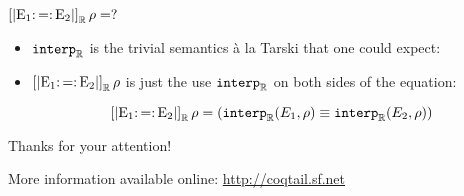 \documentclass{beamer}
\begin{document}
\begin{frame}{$\SemR = ?$}
\begin{itemize}
\item $\IR$ is the trivial semantics à la Tarski that one could expect:
\item<2-> $\SemR$ is just the use $\IR$ on both sides of the equation:

$$\SemR = (\IR(E_1, \rho) \equiv \IR(E_2, \rho))$$
\end{itemize}
\end{frame}

\begin{frame}{Thanks for your attention!}

\begin{block}{More information available online:}
\url{http://coqtail.sf.net}
\end{block}

\end{frame}
\end{document}
